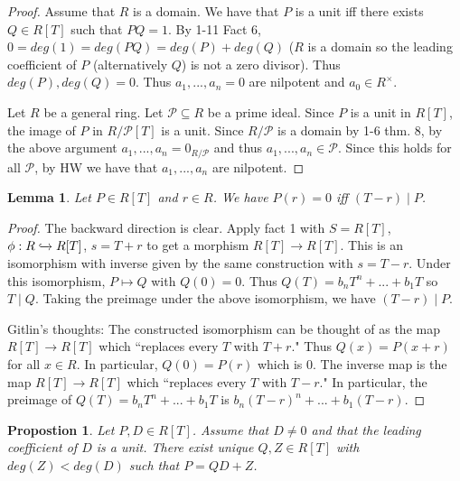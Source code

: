 \documentclass{amsart}
\newtheorem{lemma}[thm]{Lemma}
\newtheorem{prop}[thm]{Propostion}
\theoremstyle{definition}
\theoremstyle{remark}
\begin{document}
\begin{proof} \hspace{0.5cm}

Assume that $R$ is a domain.  We have that $P$ is a unit iff there exists $Q \in R[T]$ such that $PQ = 1$.  By 1-11 Fact 6, $0 = deg(1) = deg(PQ) = deg(P) + deg(Q)$ ($R$ is a domain so the leading coefficient of $P$ (alternatively $Q$) is not a zero divisor).  Thus $deg(P),deg(Q) = 0$.  Thus $a_1,...,a_n = 0$ are nilpotent and $a_0 \in R^\times$.

Let $R$ be a general ring.  Let $\mathcal{P} \subseteq R$ be a prime ideal.  Since $P$ is a unit in $R[T]$, the image of $P$ in $R / \mathcal{P}[T]$ is a unit.  Since $R/\mathcal{P}$ is a domain by 1-6 thm. 8, by the above argument $a_1,...,a_n = 0_{R/\mathcal{P}}$ and thus $a_1,...,a_n \in \mathcal{P}$.  Since this holds for all $\mathcal{P}$, by HW we have that $a_1,...,a_n$ are nilpotent.

\end{proof}

\begin{lemma}
Let $P \in R[T]$ and $r \in R$.  We have $P(r) = 0$ iff $(T-r) \mid P$.
\end{lemma}

\begin{proof}

The backward direction is clear.  Apply fact 1 with $S = R[T]$, $\phi : R \xhookrightarrow{} R[T]$, $s = T+r$ to get a morphism $R[T] \rightarrow R[T]$.  This is an isomorphism with inverse given by the same construction with $s = T-r$.  Under this isomorphism, $P \mapsto Q$ with $Q(0) = 0$.  Thus $Q(T) = b_nT^n + ... + b_1T$ so $T \mid Q$.  Taking the preimage under the above isomorphism, we have $(T-r) \mid P$.

Gitlin's thoughts:  The constructed isomorphism can be thought of as the map $R[T] \rightarrow R[T]$ which ``replaces every $T$ with $T+r$."  Thus $Q(x) = P(x+r)$ for all $x \in R$.  In particular, $Q(0) = P(r)$ which is $0$.  The inverse map is the map $R[T] \rightarrow R[T]$ which ``replaces every $T$ with $T-r$."  In particular, the preimage of $Q(T) = b_nT^n + ... + b_1T$ is $b_n(T-r)^n + ... + b_1(T-r)$.

\end{proof}

\begin{prop}
Let $P,D \in R[T]$.  Assume that $D \neq 0$ and that the leading coefficient of $D$ is a unit.  There exist unique $Q,Z \in R[T]$ with $deg(Z) < deg(D)$ such that $P = QD+Z$.
\end{prop}
\end{document}
